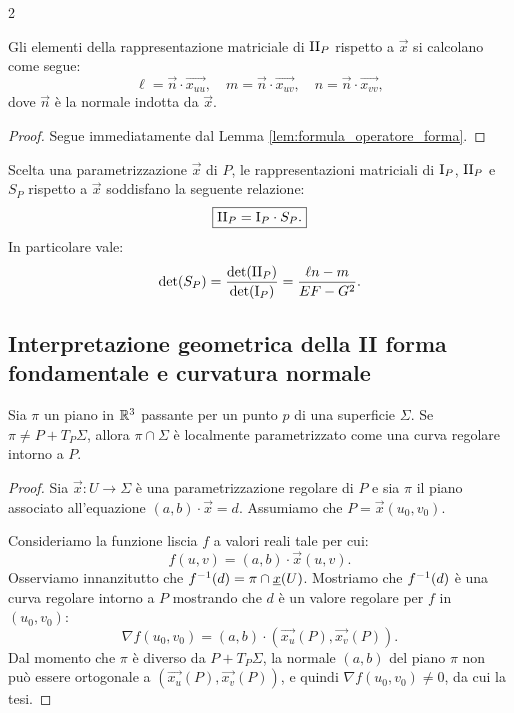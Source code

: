 \begin{multicols*}{2}
    \begin{proposition}
        Gli elementi della rappresentazione matriciale di $\mathrm{II}_P$ rispetto a $\vec{x}$
        si calcolano come segue:
        \[
            \boxed{\ell = \vec{n} \cdot \vec{x_{uu}}, \quad m = \vec{n} \cdot \vec{x_{uv}}, \quad n = \vec{n} \cdot \vec{x_{vv}},}
        \]
        dove $\vec{n}$ è la normale indotta da $\vec{x}$.
    \end{proposition}

    \begin{proof}
        Segue immediatamente dal Lemma \ref{lem:formula_operatore_forma}.
    \end{proof}

    \begin{proposition} \label{prop:formula_forme}
        Scelta una parametrizzazione $\vec{x}$ di $P$, le rappresentazioni
        matriciali di $\mathrm{I}_P$, $\mathrm{II}_P$ e $S_P$ rispetto a $\vec{x}$ soddisfano
        la seguente relazione:
        \[
            \boxed{\mathrm{II}_P = \mathrm{I}_P \cdot S_P.}
        \]
        In particolare vale:
        \[ \det(S_P) = \frac{\det(\mathrm{II}_P)}{\det(\mathrm{I}_P)} = \frac{\ell n - m}{EF-G^2}. \]
    \end{proposition}

    \subsection{Interpretazione geometrica della II forma fondamentale e curvatura normale}

    \begin{proposition}
        Sia $\pi$ un piano in $\mathbb{R}^3$ passante
        per un punto $p$ di una superficie $\Sigma$. Se $\pi \neq P + T_P \Sigma$,
        allora $\pi \cap \Sigma$ è localmente parametrizzato come una curva regolare
        intorno a $P$.
    \end{proposition}

    \begin{proof}
        Sia $\vec{x} : U \to \Sigma$ è una parametrizzazione regolare di $P$ e sia $\pi$
        il piano associato all'equazione $(a, b) \cdot \vec{x} = d$. Assumiamo che
        $P = \vec{x}(u_0, v_0)$. \smallskip

        Consideriamo la funzione liscia $f$ a valori reali tale per cui:
        \[ f(u, v) = (a, b) \cdot \vec{x}(u, v). \]
        Osserviamo innanzitutto che $f^{-1}(d) = \pi \cap {\underline{x}}(U)$. Mostriamo
        che $f^{-1}(d)$ è una curva regolare intorno a $P$ mostrando che $d$ è
        un valore regolare per $f$ in $(u_0, v_0)$:
        \[
            \nabla f(u_0, v_0) = (a, b) \cdot (\vec{x_u}(P), \vec{x_v}(P)).
        \]
        Dal momento che $\pi$ è diverso da $P + T_P \Sigma$, la normale $(a, b)$ del piano
        $\pi$ non può essere ortogonale a $(\vec{x_u}(P), \vec{x_v}(P))$, e quindi
        $\nabla f(u_0, v_0) \neq 0$, da cui la tesi.
    \end{proof}


\end{multicols*}
